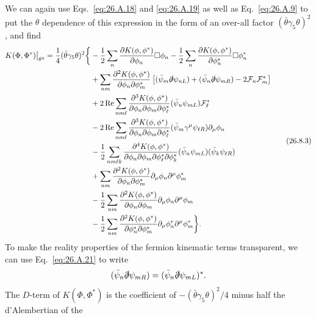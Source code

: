 We can again use Eqs.~\eqref{eq:26.A.18} and \eqref{eq:26.A.19} as well as
Eq.~\eqref{eq:26.A.9} to put the \(\theta\) dependence of this expression in
the form of an over-all factor \((\bar\theta\gamma_5\theta)^2\), and find
\begin{equation}
  \begin{aligned}
  K(\Phi,\Phi^*)\big|_{\theta^4}
  =\frac14(\bar\theta\gamma_5\theta)^2
  \biggl\{&
  -\frac12\sum_n
    \frac{\partial K(\phi,\phi^*)}{\partial\phi_n}\Box\phi_n
  -\frac12\sum_n
    \frac{\partial K(\phi,\phi^*)}{\partial\phi_n^*}\Box\phi_n^*
  \\
  &+\sum_{nm}
    \frac{\partial^2K(\phi,\phi^*)}
         {\partial\phi_n\partial\phi_m^*}
    \left[
      (\bar\psi_m\sl{\partial}\psi_{nL})
      +(\bar\psi_n\sl{\partial}\psi_{mR})
      -2\mathcal{F}_n\mathcal{F}_m^*
    \right]
  \\
  &+2\operatorname{Re}\sum_{nm\ell}
    \frac{\partial^3K(\phi,\phi^*)}
         {\partial\phi_n\partial\phi_m\partial\phi_\ell^*}
    (\bar\psi_n\psi_{mL})\mathcal{F}_\ell^*
  \\
  &-2\operatorname{Re}\sum_{nm\ell}
    \frac{\partial^3K(\phi,\phi^*)}
         {\partial\phi_n\partial\phi_m\partial\phi_\ell^*}
    (\bar\psi_m\gamma^\mu\psi_{\ell R})\partial_\mu\phi_n
  \\
  &-\frac12\sum_{nm\ell k}
    \frac{\partial^4K(\phi,\phi^*)}
         {\partial\phi_n\partial\phi_m
          \partial\phi_\ell^*\partial\phi_k^*}
    (\bar\psi_n\psi_{mL})(\bar\psi_k\psi_{\ell R})
  \\
  &+\sum_{nm}
    \frac{\partial^2K(\phi,\phi^*)}
         {\partial\phi_n\partial\phi_m^*}
    \partial_\mu\phi_n\partial^\mu\phi_m^*
  \\
  &-\frac12\sum_{nm}
    \frac{\partial^2K(\phi,\phi^*)}
         {\partial\phi_n\partial\phi_m}
    \partial_\mu\phi_n\partial^\mu\phi_m
  \\
  &-\frac12\sum_{nm}
    \frac{\partial^2K(\phi,\phi^*)}
         {\partial\phi_n^*\partial\phi_m^*}
    \partial_\mu\phi_n^*\partial^\mu\phi_m^*
  \biggr\}.
  \end{aligned}
  \tag{26.8.3}\label{eq:26.8.3}
\end{equation}
To make the reality properties of the fermion kinematic terms transparent, we
can use Eq.~\eqref{eq:26.A.21} to write
\[
  (\bar\psi_n\sl{\partial}\psi_{mR})
  =(\bar\psi_n\sl{\partial}\psi_{mL})^* .
\]
The \(D\)-term of \(K(\Phi,\Phi^*)\) is the coefficient of
\(-(\bar\theta\gamma_5\theta)^2/4\) minus half the d'Alembertian of the
